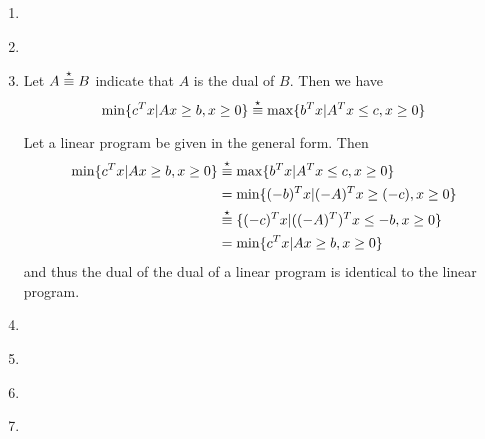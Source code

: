 \begin{enumerate}
\item \label{item:2}
  
\item \label{item:3}
  
\item \label{item:4}
  Let $A \overset{\star}\equiv B$ indicate that $A$ is the dual of $B$.  Then we have
  \begin{equation}
    \label{eq:2}
    \min \{ c^{T}x | Ax \geq b, x \geq 0 \} \overset{\star}\equiv \max \{ b^{T} x |
    A^{T}x \leq c, x \geq 0 \}
  \end{equation}

  Let a linear program be given in the general form. Then
  \begin{align}
    \label{eq:3}
    \min \{ c^{T} x | Ax \geq b, x \geq 0 \} &\overset{\star}\equiv \max \{ b^{T} x |
    A^{T}x \leq c, x \geq 0 \} \\
    &= \min \{ (-b)^{T} x | (-A)^{T} x \geq (-c), x \geq 0 \} \\
    &\overset{\star}\equiv \{ (-c)^{T} x | ((-A)^{T})^{T} x \leq -b, x \geq 0 \} \\
    &= \min \{ c^{T}x | Ax \geq b, x \geq 0 \}
  \end{align}
  and thus the dual of the dual of a linear program is identical to
  the linear program.
\item \label{item:5}
  
\item \label{item:6}
  
\item \label{item:7}
  
\item \label{item:8}
  
\end{enumerate}
